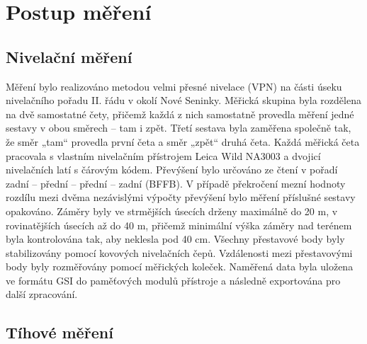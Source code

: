 \section{Postup měření}

\subsection{Nivelační měření}

Měření bylo realizováno metodou velmi přesné nivelace (VPN) na části úseku nivelačního pořadu II. řádu v okolí Nové Seninky. Měřická skupina byla rozdělena na dvě samostatné čety, přičemž každá z nich samostatně provedla měření jedné sestavy v obou směrech – tam i zpět. Třetí sestava byla zaměřena společně tak, že směr „tam“ provedla první četa a směr „zpět“ druhá četa. Každá měřická četa pracovala s vlastním nivelačním přístrojem Leica Wild NA3003 a dvojicí nivelačních latí s čárovým kódem. Převýšení bylo určováno ze čtení v pořadí zadní – přední – přední – zadní (BFFB). V případě překročení mezní hodnoty rozdílu mezi dvěma nezávislými výpočty převýšení bylo měření příslušné sestavy opakováno. Záměry byly ve strmějších úsecích drženy maximálně do 20 m, v rovinatějších úsecích až do 40 m, přičemž minimální výška záměry nad terénem byla kontrolována tak, aby neklesla pod 40 cm. Všechny přestavové body byly stabilizovány pomocí kovových nivelačních čepů. Vzdálenosti mezi přestavovými body byly rozměřovány pomocí měřických koleček. Naměřená data byla uložena ve formátu GSI do paměťových modulů přístroje a následně exportována pro další zpracování.

\subsection{Tíhové měření}
